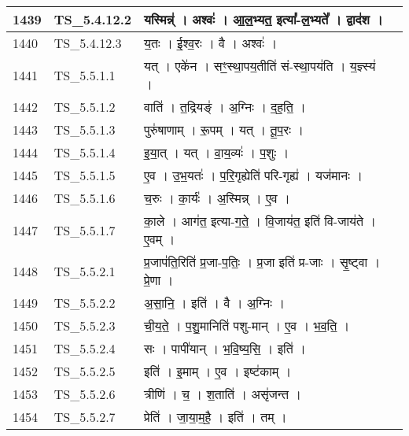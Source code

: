 \documentclass[17pt]{extarticle}
\begin{document}
\begin{longtable}{||p{0.4in}||p{0.9in}||p{4.0in}||p{0.9in}||}
        \hline
            1439 & TS\_5.4.12.2 & यस्मिन्न्॑   ।   अश्वः॑   ।   आ॒ल॒भ्यत॒ इत्या᳚{-}ल॒भ्यते᳚   ।   द्वाद॑श   ।    &      \\
        \hline
            1440 & TS\_5.4.12.3 & य॒तः   ।   ई॒श्व॒रः   ।   वै   ।   अश्वः॑   ।    &      \\
        \hline
            1441 & TS\_5.5.1.1 & यत्   ।   एके॑न   ।   सꣳ॒॒स्था॒पय॒तीति॑ सं{-}स्था॒पय॑ति   ।   य॒ज्ञ्स्य॑   ।    &      \\
        \hline
            1442 & TS\_5.5.1.2 & वाति॑   ।   त॒द्रियङ्॑   ।   अ॒ग्निः   ।   द॒ह॒ति॒   ।    &      \\
        \hline
            1443 & TS\_5.5.1.3 & पुरु॑षाणाम्   ।   रू॒पम्   ।   यत्   ।   तू॒प॒रः   ।    &      \\
        \hline
            1444 & TS\_5.5.1.4 & इ॒या॒त्   ।   यत्   ।   वा॒य॒व्यः॑   ।   प॒शुः   ।    &      \\
        \hline
            1445 & TS\_5.5.1.5 & ए॒व   ।   उ॒भ॒यतः॑   ।   प॒रि॒गृह्येति॑ परि{-}गृह्य॑   ।   यज॑मानः   ।    &      \\
        \hline
            1446 & TS\_5.5.1.6 & च॒रुः   ।   का॒र्यः॑   ।   अ॒स्मिन्न्   ।   ए॒व   ।    &      \\
        \hline
            1447 & TS\_5.5.1.7 & का॒ले   ।   आग॑त॒ इत्या{-}ग॒ते॒   ।   वि॒जाय॑त॒ इति॑ वि{-}जाय॑ते   ।   ए॒वम्   ।    &      \\
        \hline
            1448 & TS\_5.5.2.1 & प्र॒जाप॑ति॒रिति॑ प्र॒जा{-}प॒तिः॒   ।   प्र॒जा इति॑ प्र{-}जाः   ।   सृ॒ष्ट्वा   ।   प्रे॒णा   ।    &      \\
        \hline
            1449 & TS\_5.5.2.2 & अ॒सा॒नि॒   ।   इति॑   ।   वै   ।   अ॒ग्निः   ।    &      \\
        \hline
            1450 & TS\_5.5.2.3 & ची॒य॒ते॒   ।   प॒शु॒मानिति॑ पशु{-}मान्   ।   ए॒व   ।   भ॒व॒ति॒   ।    &      \\
        \hline
            1451 & TS\_5.5.2.4 & सः   ।   पापी॑यान्   ।   भ॒वि॒ष्य॒सि॒   ।   इति॑   ।    &      \\
        \hline
            1452 & TS\_5.5.2.5 & इति॑   ।   इ॒माम्   ।   ए॒व   ।   इष्ट॑काम्   ।    &      \\
        \hline
            1453 & TS\_5.5.2.6 & त्रीणि॑   ।   च॒   ।   श॒ताति॑   ।   असृ॑जन्त   ।    &      \\
        \hline
            1454 & TS\_5.5.2.7 & प्रेति॑   ।   जा॒या॒म॒है॒   ।   इति॑   ।   तम्   ।    &      \\
        \hline

\end{longtable}
\end{document}
